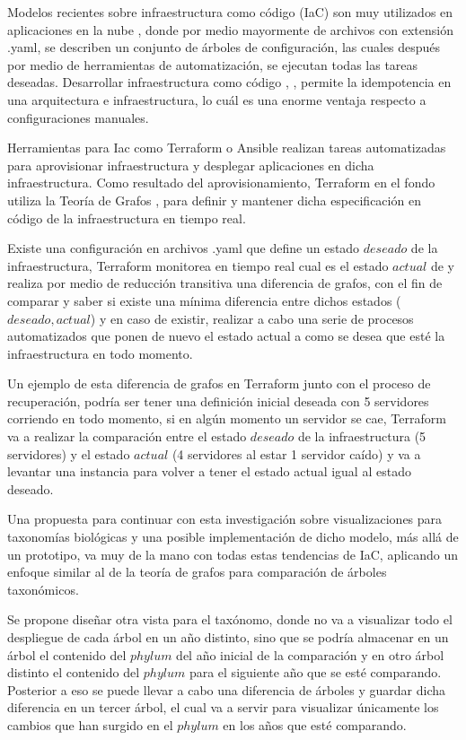 \documentclass[journal]{IEEEtran}
\begin{document}
Modelos recientes sobre infraestructura como código (IaC) \cite{artac-iac} son muy utilizados en aplicaciones en la nube \cite{morris-iac}, donde por medio mayormente de archivos con extensión .yaml, se describen un conjunto de árboles de configuración, las cuales después por medio de herramientas de automatización, se ejecutan todas las tareas deseadas. Desarrollar infraestructura como código \cite{guerr-iac}, \cite{huttermann-iac}, permite la idempotencia en una arquitectura e infraestructura, lo cuál es una enorme ventaja respecto a configuraciones manuales.

Herramientas para Iac como Terraform o Ansible \cite{terraf-ansib} realizan tareas automatizadas para aprovisionar infraestructura y desplegar aplicaciones en dicha infraestructura. Como resultado del aprovisionamiento, Terraform en el fondo utiliza la Teoría de Grafos \cite{Aldous-graphs}, \cite{Kamada-graphs} para definir y mantener dicha especificación en código de la infraestructura en tiempo real. 

Existe una configuración en archivos .yaml que define un estado $deseado$ de la infraestructura, Terraform monitorea en tiempo real cual es el estado $actual$ de y realiza por medio de reducción transitiva una diferencia de grafos, con el fin de comparar y saber si existe una mínima diferencia entre dichos estados ($deseado, actual$) y en caso de existir, realizar a cabo una serie de procesos automatizados que ponen de nuevo el estado actual a como se desea que esté la infraestructura en todo momento.

Un ejemplo de esta diferencia de grafos en Terraform junto con el proceso de recuperación, podría ser tener una definición inicial deseada con 5 servidores corriendo en todo momento, si en algún momento un servidor se cae, Terraform va a realizar la comparación entre el estado $deseado$ de la infraestructura (5 servidores) y el estado $actual$ (4 servidores al estar 1 servidor caído) y va a levantar una instancia para volver a tener el estado actual igual al estado deseado.

Una propuesta para continuar con esta investigación sobre visualizaciones para taxonomías biológicas y una posible implementación de dicho modelo, más allá de un prototipo, va muy de la mano con todas estas tendencias de IaC, aplicando un enfoque similar al de la teoría de grafos para comparación de árboles taxonómicos.

Se propone diseñar otra vista para el taxónomo, donde no va a visualizar todo el despliegue de cada árbol en un año distinto, sino que se podría almacenar en un árbol el contenido del $phylum$ del año inicial de la comparación y en otro árbol distinto el contenido del $phylum$ para el siguiente año que se esté comparando. Posterior a eso se puede llevar a cabo una diferencia de árboles y guardar dicha diferencia en un tercer árbol, el cual va a servir para visualizar únicamente los cambios que han surgido en el $phylum$ en los años que esté comparando. 
\end{document}
